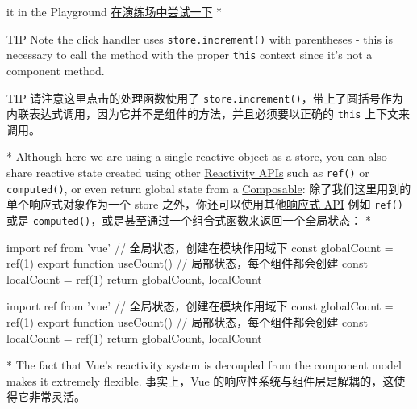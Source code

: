 \begin{paracol}{2}
{it in the Playground}
\switchcolumn
\href{https://play.vuejs.org/\#eNrNkk1uwyAQha8yYpNEiUzXllPVrtRTeJNSqtLGgGBsVbK4ewdwnT9FWWSTFczwmPc+xMhqa4uhl6xklRdOWQQvsbfPrVadNQ7h1dCqpcYaPp3pYFHwQyteXVxKm0tpM0krnm3IgAqUnd3vUFIFUB1Z8bNOkzoVny+wDTuNcZ1gBI/GSQhzqlQX3/5Gng81pA1t33tEo+FF7JX42bYsT1BaONlRguWqZZMU4C261CWMk3EhTK8RQphm8Twse/BscoUsvdqDkTX3kP3nI6aZwcmdQDUcMPJPabX8TQphtCf0RLqd1csxuqQAJTxtYnEUGtIpAH4pn1Ou17FDScOKhT+QNAVM}{在演练场中尝试一下}
\switchcolumn[0]*%
\begin{vueQuote}{TIP}
Note the click handler uses \texttt{store.increment()} with parentheses
- this is necessary to call the method with the proper \texttt{this}
context since it's not a component method.
\end{vueQuote} 
\switchcolumn
\begin{vueQuote}{TIP}
请注意这里点击的处理函数使用了
\texttt{store.increment()}，带上了圆括号作为内联表达式调用，因为它并不是组件的方法，并且必须要以正确的
\texttt{this} 上下文来调用。
\end{vueQuote} 
\switchcolumn[0]*%
Although here we are using a single reactive object as a store, you can
also share reactive state created using other
\href{https://vuejs.org/api/reactivity-core.html}{Reactivity APIs} such
as \texttt{ref()} or \texttt{computed()}, or even return global state
from a
\href{https://vuejs.org/guide/reusability/composables.html}{Composable}:
\switchcolumn
除了我们这里用到的单个响应式对象作为一个 store
之外，你还可以使用其他\href{https://cn.vuejs.org/api/reactivity-core.html}{响应式
API} 例如 \texttt{ref()} 或是
\texttt{computed()}，或是甚至通过一个\href{https://cn.vuejs.org/guide/reusability/composables.html}{组合式函数}来返回一个全局状态：
\switchcolumn[0]*%
\begin{codeJs}
import { ref } from 'vue'
// 全局状态，创建在模块作用域下
const globalCount = ref(1)
export function useCount() {
  // 局部状态，每个组件都会创建
  const localCount = ref(1)
  return {
    globalCount,
    localCount
  }
}
\end{codeJs}
\switchcolumn
\begin{codeJs}
import { ref } from 'vue'
// 全局状态，创建在模块作用域下
const globalCount = ref(1)
export function useCount() {
  // 局部状态，每个组件都会创建
  const localCount = ref(1)
  return {
    globalCount,
    localCount
  }
}
\end{codeJs}
\switchcolumn[0]*%
The fact that Vue's reactivity system is decoupled from the component
model makes it extremely flexible.
\switchcolumn
事实上，Vue 的响应性系统与组件层是解耦的，这使得它非常灵活。
\end{paracol}

